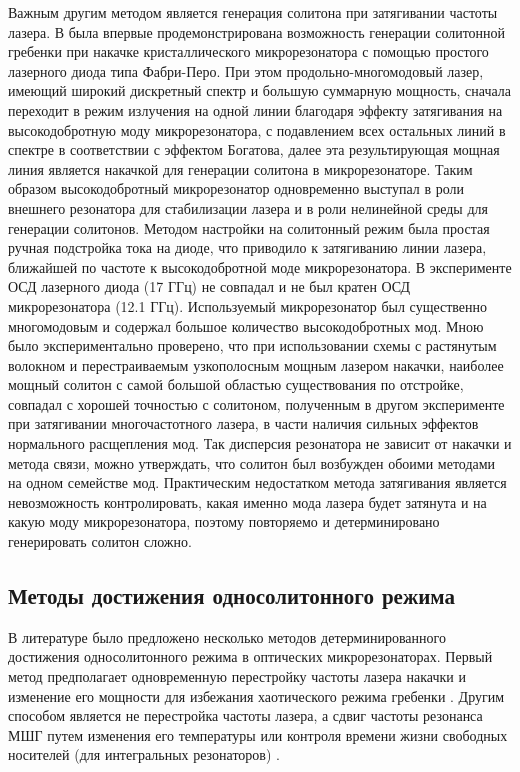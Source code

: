 Важным другим методом является генерация солитона при затягивании частоты лазера. В \cite{Pavlov2018} была впервые продемонстрирована возможность генерации солитонной гребенки при накачке кристаллического микрорезонатора с помощью простого лазерного диода типа Фабри-Перо. При этом продольно-многомодовый лазер, имеющий широкий дискретный спектр и большую суммарную мощность, сначала переходит в режим излучения на одной линии благодаря эффекту затягивания на высокодобротную моду микрорезонатора, с подавлением всех остальных линий в спектре в соответствии с эффектом Богатова, далее эта результирующая мощная линия является накачкой для генерации солитона в микрорезонаторе. Таким образом высокодобротный микрорезонатор одновременно выступал в роли внешнего резонатора для стабилизации лазера и в роли нелинейной среды для генерации солитонов. Методом настройки на солитонный режим была простая ручная подстройка тока на диоде, что приводило к затягиванию линии лазера, ближайшей по частоте к высокодобротной моде микрорезонатора. В эксперименте ОСД лазерного диода (17 ГГц) не совпадал и не был кратен ОСД микрорезонатора (12.1 ГГц). Используемый микрорезонатор был существенно многомодовым и содержал большое количество высокодобротных мод. Мною было экспериментально проверено, что при использовании схемы с растянутым волокном и перестраиваемым узкополосным мощным лазером накачки, наиболее мощный солитон с самой большой областью существования по отстройке, совпадал с хорошей точностью с солитоном, полученным в другом эксперименте при затягивании многочастотного лазера, в части наличия сильных эффектов нормального расщепления мод. Так дисперсия резонатора не зависит от накачки и метода связи, можно утверждать, что солитон был возбужден обоими методами на одном семействе мод. Практическим недостатком метода затягивания является невозможность контролировать, какая именно мода лазера будет затянута и на какую моду микрорезонатора, поэтому повторяемо и детерминировано генерировать солитон сложно.


\subsection{Методы достижения односолитонного режима}

В литературе было предложено несколько методов детерминированного достижения односолитонного режима в оптических микрорезонаторах. Первый метод предполагает одновременную перестройку частоты лазера накачки и изменение его мощности для избежания хаотического режима гребенки \cite{Jaramillo2015}. Другим способом является не перестройка частоты лазера, а сдвиг частоты резонанса МШГ путем изменения его температуры \cite{Joshi2016} или контроля времени жизни свободных носителей (для интегральных резонаторов) \cite{Yu2016}.


